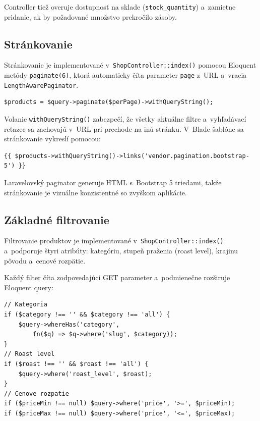 \documentclass[12pt, a4paper]{article}
\begin{document}
Controller tiež overuje dostupnosť na sklade (\texttt{stock\_quantity}) a~zamietne pridanie, ak by požadované množstvo prekročilo zásoby.

\subsection{Stránkovanie}

Stránkovanie je implementované v~\texttt{ShopController::index()} pomocou Eloquent metódy \texttt{paginate(6)}, ktorá automaticky číta parameter \texttt{page} z~URL a~vracia \texttt{LengthAwarePaginator}.

\begin{lstlisting}
$products = $query->paginate($perPage)->withQueryString();
\end{lstlisting}

Volanie \texttt{withQueryString()} zabezpečí, že všetky aktuálne filtre a~vyhľadávací reťazec sa zachovajú v~URL pri prechode na inú stránku. V~Blade šablóne sa stránkovanie vykreslí pomocou:

\begin{lstlisting}
{{ $products->withQueryString()->links('vendor.pagination.bootstrap-5') }}
\end{lstlisting}

Laravelovský paginator generuje HTML s~Bootstrap 5 triedami, takže stránkovanie je vizuálne konzistentné so zvyškom aplikácie.

\subsection{Základné filtrovanie}

Filtrovanie produktov je implementované v~\texttt{ShopController::index()} a~podporuje štyri atribúty: kategóriu, stupeň praženia (roast level), krajinu pôvodu a~cenové rozpätie.

Každý filter číta zodpovedajúci GET parameter a~podmienečne rozširuje Eloquent query:

\begin{lstlisting}
// Kategoria
if ($category !== '' && $category !== 'all') {
    $query->whereHas('category',
        fn($q) => $q->where('slug', $category));
}
// Roast level
if ($roast !== '' && $roast !== 'all') {
    $query->where('roast_level', $roast);
}
// Cenove rozpatie
if ($priceMin !== null) $query->where('price', '>=', $priceMin);
if ($priceMax !== null) $query->where('price', '<=', $priceMax);
\end{lstlisting}
\end{document}
